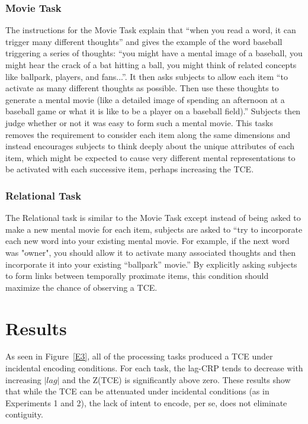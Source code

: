\documentclass[jou,natbib]{apa6} %
\begin{document}
\subsubsection{Movie Task} The instructions for the Movie Task explain that ``when you read a word, it can trigger many different thoughts'' and gives the example of the word baseball triggering a series of thoughts: ``you might have a mental image of a baseball, you might hear the crack of a bat hitting a ball, you might think of related concepts like ballpark, players, and fans...''. It then asks subjects to allow each item ``to activate as many different thoughts as possible. Then use these thoughts to generate a mental movie (like a detailed image of spending an afternoon at a baseball game or what it is like to be a player on a baseball field).'' Subjects then judge whether or not it was easy to form such a mental movie. This tasks removes the requirement to consider each item along the same dimensions and instead encourages subjects to think deeply about the unique attributes of each item, which might be expected to cause very different mental representations to be activated with each successive item, perhaps increasing the TCE. 

\subsubsection{Relational Task} The Relational task is similar to the Movie Task except instead of being asked to make a new mental movie for each item, subjects are asked to ``try to incorporate each new word into your existing mental movie. For example, if the next word was "owner", you should allow it to activate many associated thoughts and then incorporate it into your existing ``ballpark'' movie.'' By explicitly asking subjects to form links between temporally proximate items, this condition should maximize the chance of observing a TCE. 

\section{Results}

As seen in Figure~\ref{E3}, all of the processing tasks produced a TCE under incidental encoding conditions. For each task, the lag-CRP tends to decrease with increasing $|lag|$ and the Z(TCE) is significantly above zero. These results show that while the TCE can be attenuated under incidental conditions (as in Experiments 1 and 2), the lack of intent to encode, per se, does not eliminate contiguity. 
\end{document}
